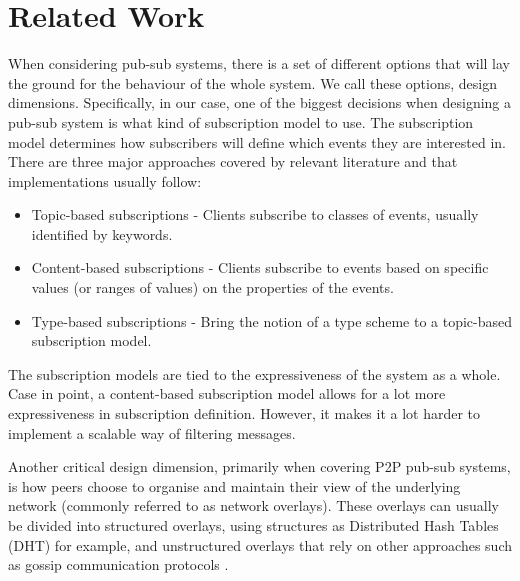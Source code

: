
\section{Related Work}
\label{section:related-work}

When considering pub-sub systems, there is a set of different options that will
lay the ground for the behaviour of the whole system. We call these options,
design dimensions. Specifically, in our case, one of the biggest decisions when
designing a pub-sub system is what kind of subscription model to use. The
subscription model determines how subscribers will define which events they are
interested in. There are three major approaches covered by relevant literature
\cite{Kermarrec2013} \cite{Eugster2003} and that implementations usually
follow:

\begin{itemize}
  \item
    Topic-based subscriptions - Clients subscribe to classes of events, usually identified by keywords.\cite{Castro2002}\cite{Zhuang2001}\cite{Baldoni2007}\cite{Apolonia2018}\cite{Setty2012}
  \item
    Content-based subscriptions - Clients subscribe to events based on specific values (or ranges of values) on the properties of the events.\cite{Strom1998}\cite{Cugola2001}\cite{Carzaniga2003}\cite{Gupta2004}\cite{Bharambe2002}\cite{Voulgaris2005}
  \item
    Type-based subscriptions\cite{Eugster2000} - Bring the notion of a type scheme to a topic-based subscription model.\cite{Pietzuch2002}
\end{itemize}

The subscription models are tied to the expressiveness of the system as a
whole. Case in point, a content-based subscription model allows for a lot more
expressiveness in subscription definition. However, it makes it a lot harder to
implement a scalable way of filtering messages.

Another critical design dimension, primarily when covering P2P pub-sub systems,
is how peers choose to organise and maintain their view of the underlying
network (commonly referred to as network overlays). These overlays can usually
be divided into structured overlays, using structures as Distributed Hash
Tables (DHT) \cite{Maymounkov2002} \cite{Stoica2001} for example, and
unstructured overlays that rely on other approaches such as gossip
communication protocols \cite{Voulgaris2005a} \cite{Zheng2016}. 

